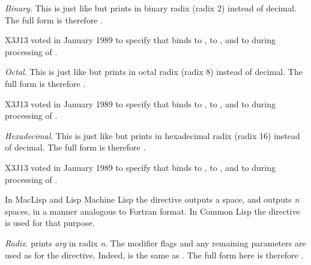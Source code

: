 \begin{flushdesc}
\item[\cd{{\Xtilde}B}]
{\it Binary}.
This is just like  but prints in binary radix (radix 2)
instead of decimal.  The full form is therefore
.

\begin{new}
X3J13 voted in January 1989
to specify that  binds 
to ,  to , and  to 
during processing of .
\end{new}

\item[\cd{{\Xtilde}O}]
{\it Octal}.
This is just like  but prints in octal radix (radix 8)
instead of decimal.  The full form is therefore
.

\begin{new}
X3J13 voted in January 1989
to specify that  binds 
to ,  to , and  to 
during processing of .
\end{new}

\item[\cd{{\Xtilde}X}]
{\it Hexadecimal}.
This is just like  but prints in hexadecimal radix
(radix 16) instead of decimal.  The full form is therefore
.

\begin{new}
X3J13 voted in January 1989
to specify that  binds 
to ,  to , and  to 
during processing of .
\end{new}

\beforenoterule
\begin{incompatibility}
In MacLisp and Lisp Machine Lisp the  directive
outputs a space, and  outputs {\it n} spaces,
in a manner analogous to Fortran  format.
In Common Lisp the directive  is used for that purpose.
\end{incompatibility}
\afternoterule

\item[\cd{{\Xtilde}R}]
{\it Radix}.
 prints {\it arg} in radix {\it n}.
The modifier flags and any remaining parameters are used as for
the  directive.
Indeed,  is the same as .  The full form here is therefore
.


\end{flushdesc}
